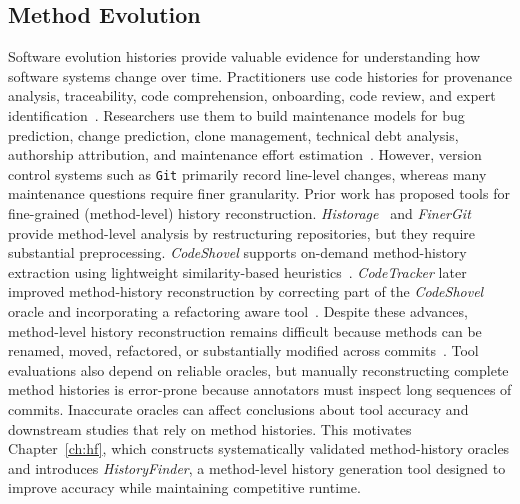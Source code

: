 \subsection{Method Evolution}
Software evolution histories provide valuable evidence for understanding how software systems change over time. Practitioners use code histories for provenance analysis, traceability, code comprehension, onboarding, code review, and expert identification~\cite{grund_codeshovel_2021}. Researchers use them to build maintenance models for bug prediction, change prediction, clone management, technical debt analysis, authorship attribution, and maintenance effort estimation~\cite{duala-ekoko_tracking_2007, kashiwabara_method_2015, meng_mining_2013, rahman_ownership_2011, pascarella_performance_2020, chowdhury_method-level_2024, chowdhury_good_2025, chowdhury_evidence_2025}. However, version control systems such as \texttt{Git} primarily record line-level changes, whereas many maintenance questions require finer granularity. Prior work has proposed tools for fine-grained (method-level) history reconstruction. \textit{Historage}~\cite{hata_historage_2011} and \textit{FinerGit}~\cite{higo_tracking_2020} provide method-level analysis by restructuring repositories, but they require substantial preprocessing. \textit{CodeShovel} supports on-demand method-history extraction using lightweight similarity-based heuristics~\cite{grund_codeshovel_2021}. \textit{CodeTracker} later improved method-history reconstruction by correcting part of the \textit{CodeShovel} oracle and incorporating a refactoring aware tool~\cite{jodavi_accurate_2022}. Despite these advances, method-level history reconstruction remains difficult because methods can be renamed, moved, refactored, or substantially modified across commits~\cite{higo_tracking_2020, grund_codeshovel_2021, jodavi_accurate_2022}. Tool evaluations also depend on reliable oracles, but manually reconstructing complete method histories is error-prone because annotators must inspect long sequences of commits. Inaccurate oracles can affect conclusions about tool accuracy and downstream studies that rely on method histories. This motivates Chapter~\ref{ch:hf}, which constructs systematically validated method-history oracles and introduces \textit{HistoryFinder}, a method-level history generation tool designed to improve accuracy while maintaining competitive runtime.


